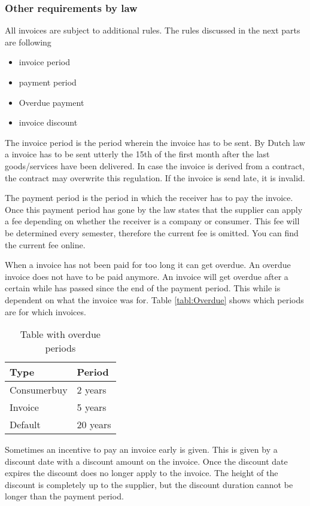 \documentclass{report}
\begin{document}
\subsubsection{Other requirements by law}
All invoices are subject to additional rules. The rules discussed in the next parts are following
\begin{itemize}
	\item invoice period
	\item payment period
	\item Overdue payment
	\item invoice discount
\end{itemize}

The invoice period is the period wherein the invoice has to be sent. By Dutch law a invoice has to be sent utterly the 15th of the first month after the last goods/services have been delivered. In case the invoice is derived from a contract, the contract may overwrite this regulation. If the invoice is send late, it is invalid.

The payment period is the period in which the receiver has to pay the invoice. Once this payment period has gone by the law states that the supplier can apply a fee depending on whether the receiver is a company or consumer. This fee will be determined every semester, therefore the current fee is omitted. You can find the current fee online.

When a invoice has not been paid for too long it can get overdue. An overdue invoice does not have to be paid anymore. An invoice will get overdue after a certain while has passed since the end of the payment period. This while is dependent on what the invoice was for. Table \ref{tabl:Overdue} shows which periods are for which invoices.
\begin{table}[h]
	\centering
	\label{tab:Overdue}
	\begin{tabular}{l|l}
		Type        & Period   \\\hline \hline
		Consumerbuy & 2 years  \\\hline
		Invoice     & 5 years  \\\hline
		Default     & 20 years   	
	\end{tabular}
	\caption{Table with overdue periods}
\end{table}

Sometimes an incentive to pay an invoice early is given. This is given by a discount date with a discount amount on the invoice. Once the discount date expires the discount does no longer apply to the invoice. The height of the discount is completely up to the supplier, but the discount duration cannot be longer than the payment period.   
\end{document}
